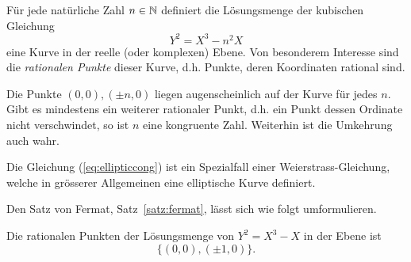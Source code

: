 Für jede natürliche Zahl $n\in{\mathbb{N}}$ definiert
die Lösungsmenge der kubischen Gleichung
\begin{equation}
  \label{eq:ellipticcong}
  Y^2 = X^3-n^2X  
\end{equation}
eine Kurve in der reelle (oder komplexen) Ebene. Von besonderem
Interesse sind die \emph{rationalen Punkte} dieser Kurve, d.h. Punkte,
deren Koordinaten rational sind.

Die Punkte $(0,0),(\pm n,0)$ liegen augenscheinlich auf der Kurve für
jedes $n$. Gibt es mindestens ein weiterer rationaler Punkt, d.h. ein
Punkt dessen Ordinate nicht verschwindet, so ist $n$ eine kongruente
Zahl.
Weiterhin ist die Umkehrung auch wahr. 


Die Gleichung (\ref{eq:ellipticcong}) ist ein Spezialfall einer
Weierstrass-Gleichung, welche in grösserer Allgemeinen eine elliptische Kurve
definiert.

Den Satz von Fermat, Satz~\ref{satz:fermat}, lässt sich wie folgt
umformulieren.

\begin{theorem}
  \label{satz:fermat2}
  Die rationalen Punkten der Lösungsmenge von $Y^2 = X^3-X$ in der Ebene ist
  $$
  \{(0,0),(\pm 1,0)\}.
  $$
\end{theorem}


